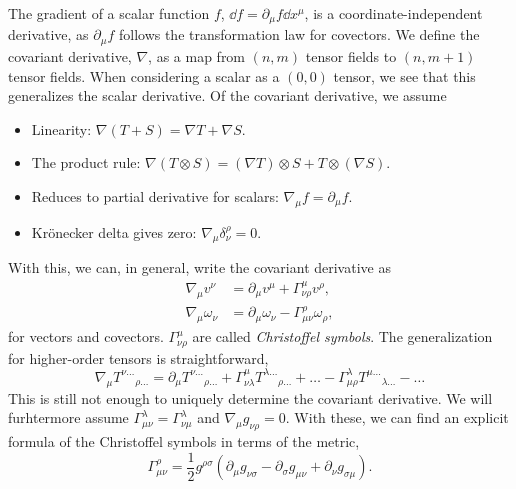 The gradient of a scalar function $f$, $\dd f = \partial_\mu f \dd x^\mu$, is a coordinate-independent derivative, as $\partial_\mu f$ follows the transformation law for covectors.
We define the covariant derivative, $\nabla$, as a map from $(n, m)$ tensor fields to $(n, m+1)$ tensor fields.
When considering a scalar as a $(0, 0)$ tensor, we see that this generalizes the scalar derivative.
Of the covariant derivative, we assume
%
\begin{itemize}
    \item Linearity: $\nabla (T + S) = \nabla T + \nabla S$.
    \item The product rule: $\nabla (T \otimes S) = (\nabla T)\otimes S + T \otimes (\nabla S)$.
    \item Reduces to partial derivative for scalars: $\nabla_\mu f = \partial_\mu f$.
    \item Krönecker delta gives zero: $\nabla_\mu \delta^\rho_\nu = 0$.
\end{itemize}
%
With this, we can, in general, write the covariant derivative as~\autocite{carrollSpacetimeGeometryIntroduction2019}
%
\begin{align}
    \nabla_\mu v^\nu &= \partial_\mu v^\mu + \Gamma^\mu_{\nu \rho} v^\rho, \\
    \nabla_\mu \omega_\nu &= \partial_\mu \omega_\nu - \Gamma^\rho_{\mu \nu} \omega_\rho,
\end{align}
%
for vectors and covectors.
$\Gamma^{\mu}_{\nu \rho}$ are called \emph{Christoffel symbols}.
The generalization for higher-order tensors is straightforward, 
%
\begin{equation}
    \nabla_\mu T^{\nu\dots}{}_{\rho\dots}
    =
    \partial_\mu T^{\nu\dots}{}_{\rho\dots}
    + \Gamma^\mu_{\nu \lambda} T^{\lambda\dots}{}_{\rho\dots} +\dots
    - \Gamma^\lambda_{\mu \rho} T^{\mu\dots}{}_{\lambda\dots} -\dots
\end{equation}
%
This is still not enough to uniquely determine the covariant derivative.
We will furhtermore assume $\Gamma^{\lambda}_{\mu \nu} = \Gamma^{\lambda}_{\nu \mu}$ and $\nabla_\mu g_{\nu \rho} = 0$.
With these, we can find an explicit formula of the Christoffel symbols in terms of the metric, 
%
\begin{equation}
    \label{christoffel symbols from metric}
    \Gamma^\rho_{\mu \nu} = \frac{1}{2} g^{\rho \sigma} (\partial_\mu g_{\nu \sigma} - \partial_\sigma g_{\mu \nu} + \partial_{\nu}g_{\sigma \mu}).
\end{equation}
%

